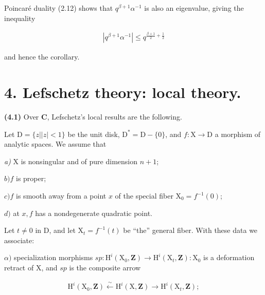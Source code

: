 \documentclass[10pt,leqno]{article}
\begin{document}
\noindent Poincaré duality (2.12) shows that \(q^{\beta +1}\alpha ^{- 1}\) is also an eigenvalue, giving the inequality\par

\begin{equation*}\begin{gathered}|q^{\beta +1}\alpha ^{- 1}| \leq  q^{\frac{\beta+1}{2}+\frac{1}{2}}\end{gathered}\end{equation*}

\noindent and hence the corollary.\par

\section*{4. Lefschetz theory: local theory.}

\noindent \textbf{(4.1)} Over \(\mathbf{C}\), Lefschetz's local results are the following.\par

\noindent Let \(\mathrm{D}=\{z | |z|<1\}\) be the unit disk, \(\mathrm{D}^{*}=\mathrm{D}- \{0\}\), and \(f : \mathrm{X}\longrightarrow \mathrm{D}\) a morphism of analytic spaces. We assume that\par

\noindent \emph{a)} \(\mathrm{X}\) is nonsingular and of pure dimension \(n+1\);\par

\noindent \(b) f\) is proper;\par

\noindent \(c) f\) is smooth away from a point \(x\) of the special fiber \(\mathrm{X}_{0}=f^{- 1}(0)\);\par

\noindent \(d)\) at \(x, f\) has a nondegenerate quadratic point.\par

\noindent Let \(t\ne 0\) in \(\mathrm{D}\), and let \(\mathrm{X}_{t}=f^{- 1}(t)\) be “the” general fiber. With these data we associate:\par

\noindent \(\alpha )\) specialization morphisms \(\mathit{sp} : \mathrm{H}^{i}(\mathrm{X}_{0},\mathbf{Z})\longrightarrow \mathrm{H}^{i}(\mathrm{X}_{t},\mathbf{Z}) : \mathrm{X}_{0}\) is a deformation retract of \(\mathrm{X}\), and \(\mathit{sp}\) is the composite arrow\par

\begin{equation*}\begin{gathered}\mathrm{H}^{i}(\mathrm{X}_{0},\mathbf{Z}) \xleftarrow{\sim } \mathrm{H}^{i}(\mathrm{X},\mathbf{Z}) \longrightarrow  \mathrm{H}^{i}(\mathrm{X}_{t},\mathbf{Z});\end{gathered}\end{equation*}
\end{document}

